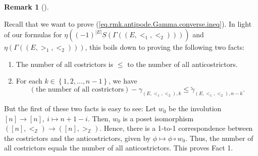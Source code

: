 \documentclass[numbers=enddot,12pt,final,onecolumn,notitlepage,abstracton]{scrartcl}
\theoremstyle{definition}
\newtheorem{remk}[theo]{Remark}
\newenvironment{remark}[1][]
{\begin{remk}[#1]\begin{leftbar}}
{\end{leftbar}\end{remk}}
\newenvironment{verlong}{}{}
\begin{document}
\begin{remark}
\begin{verlong}
Recall that we want to prove (\ref{eq.rmk.antipode.Gamma.converse.ineq}). In
light of our formulas for $\eta\left(  \left(  -1\right)  ^{\left\vert
E\right\vert }S\left(  \Gamma\left(  \left(  E,<_{1},<_{2}\right)  \right)
\right)  \right)  $ and $\eta\left(  \Gamma\left(  \left(  E,>_{1}%
,<_{2}\right)  \right)  \right)  $, this boils down to proving the following
two facts:

\begin{enumerate}
\item The number of all costrictors is $\leq$ to the number of all anticostrictors.

\item For each $k\in\left\{  1,2,\ldots,n-1\right\}  $, we have
\[
\left(  \text{the number of all costrictors}\right)  -\gamma_{\left(
E,<_{1},<_{2}\right)  ,k}\leq\widetilde{\gamma}_{\left(  E,<_{1},<_{2}\right)
,n-k}.
\]

\end{enumerate}

But the first of these two facts is easy to see: Let $w_{0}$ be the involution
$\left[  n\right]  \rightarrow\left[  n\right]  ,\ i\mapsto n+1-i$. Then,
$w_{0}$ is a poset isomorphism $\left(  \left[  n\right]  ,<_{\mathbb{Z}%
}\right)  \rightarrow\left(  \left[  n\right]  ,>_{\mathbb{Z}}\right)  $.
Hence, there is a 1-to-1 correspondence between the costrictors and the
anticostrictors, given by $\phi\mapsto\phi\circ w_{0}$. Thus, the number of
all costrictors equals the number of all anticostrictors. This proves Fact 1.


\end{verlong}
\end{remark}
\end{document}
